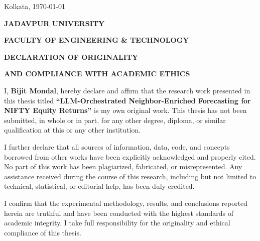 \documentclass[12pt,a4paper,titlepage]{article}
\begin{document}
\begin{titlepage}
    \vfill
    
    {\small Kolkata, \today}
    
\end{titlepage}

\begin{titlepage}
    \centering
    
    {\Large\bfseries JADAVPUR UNIVERSITY\par}
    \vspace{0.2cm}
    {\large\bfseries FACULTY OF ENGINEERING \& TECHNOLOGY\par}
    
    \vspace{2cm}
    
    {\Large\bfseries DECLARATION OF ORIGINALITY\par}
    {\large\bfseries AND COMPLIANCE WITH ACADEMIC ETHICS\par}
    
    \vspace{1.2cm}
    
    \begin{minipage}{0.9\textwidth}
        \setlength{\parindent}{1em}
        \setlength{\parskip}{0.5em}
        \normalsize
        
        I, \textbf{Bijit Mondal}, hereby declare and affirm that the research work presented in this thesis titled \textbf{``LLM-Orchestrated Neighbor-Enriched Forecasting for NIFTY Equity Returns''} is my own original work. This thesis has not been submitted, in whole or in part, for any other degree, diploma, or similar qualification at this or any other institution.
        
        \vspace{0.2cm}
        
        I further declare that all sources of information, data, code, and concepts borrowed from other works have been explicitly acknowledged and properly cited. No part of this work has been plagiarized, fabricated, or misrepresented. Any assistance received during the course of this research, including but not limited to technical, statistical, or editorial help, has been duly credited.
        
        \vspace{0.2cm}
        
        I confirm that the experimental methodology, results, and conclusions reported herein are truthful and have been conducted with the highest standards of academic integrity. I take full responsibility for the originality and ethical compliance of this thesis.
        

\end{minipage}
\end{titlepage}
\end{document}

